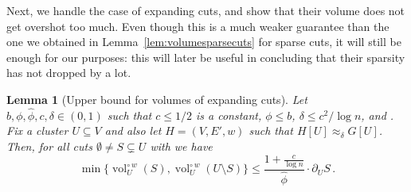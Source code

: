\documentclass[epsfig,letter,11pt]{article}
\numberwithin{equation}{section}
\newcommand{\wvolc}[2]{\operatorname{vol}_{#2}^{\circ \,w} (#1)}
\newcommand{\uncut}[2]{{\partial}_{#2} #1}
\renewcommand{\hat}{\widehat}
\newtheorem{lemma}[theorem]{Lemma}
\begin{document}
\noindent
Next, we handle the case of expanding cuts, and show that their volume does not get overshot too much. Even though this is a much weaker guarantee than the one we obtained in Lemma~\ref{lem:volumesparsecuts} for sparse cuts, it will  still be enough for our purposes: this will later be useful in concluding that their sparsity has not dropped by a lot.

\begin{lemma}[Upper bound for volumes of expanding cuts]
	\label{lem:testexpandingcuts}
	Let $b, \phi,\hat{\phi}, c,\delta \in (0,1)$ such that $c \leq 1/2$ is a constant, $\phi \le b$, $\delta \le c^2 / \log n$, and \smash{$\hat{\phi} \le \phi/b$}. Fix a cluster $U \subseteq V$ and also let $H=(V,E',w)$ such that $H[U] \approx_\delta G[U]$. Then, for all cuts $\emptyset \neq S \subsetneq U$ with \smash{$\Phi_U^\circ(S) \ge \hat{\phi}$} we have
	\begin{equation*}
		\min \{\wvolc{S}{U},\wvolc{U \setminus S}{U}\} \le \frac{1+\frac{c}{\log n}}{\hat{\phi}} \cdot \uncut{S}{U}\, .
	\end{equation*}
\end{lemma}
\end{document}
